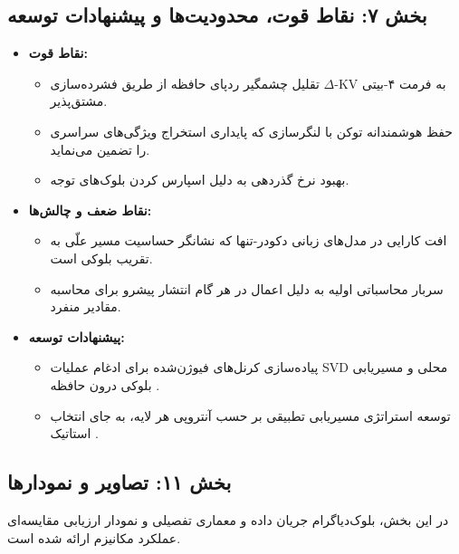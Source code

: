 \subsection*{بخش ۷: نقاط قوت، محدودیت‌ها و پیشنهادات توسعه }
\begin{itemize}
    \item \textbf{نقاط قوت:}
    \begin{itemize}
        \item تقلیل چشمگیر ردپای حافظه از طریق فشرده‌سازی $\Delta$-KV به فرمت ۴-بیتی مشتق‌پذیر.
        \item حفظ هوشمندانه توکن \lr{[CLS]} با لنگرسازی  که پایداری استخراج ویژگی‌های سراسری را تضمین می‌نماید.
        \item بهبود نرخ گذردهی  به دلیل اسپارس کردن بلوک‌های توجه.
    \end{itemize}
    \item \textbf{نقاط ضعف و چالش‌ها:}
    \begin{itemize}
        \item افت کارایی در مدل‌های زبانی دکودر-تنها  که نشانگر حساسیت مسیر علّی به تقریب بلوکی است.
        \item سربار محاسباتی اولیه به دلیل اعمال  در هر گام انتشار پیشرو برای محاسبه مقادیر منفرد.
    \end{itemize}
    \item \textbf{پیشنهادات توسعه:}
    \begin{itemize}
        \item پیاده‌سازی کرنل‌های فیوژن‌شده  برای ادغام عملیات SVD محلی و مسیریابی بلوکی درون حافظه .
        \item توسعه استراتژی مسیریابی تطبیقی بر حسب آنتروپی هر لایه، به جای انتخاب استاتیک .
    \end{itemize}
\end{itemize}

\subsection*{بخش ۱۱: تصاویر و نمودارها }
در این بخش، بلوک‌دیاگرام جریان داده و معماری تفصیلی و نمودار ارزیابی مقایسه‌ای عملکرد مکانیزم  ارائه شده است.



